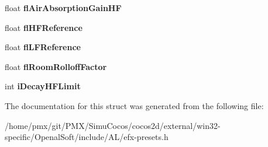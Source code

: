\begin{DoxyCompactItemize}
float {\bfseries fl\+Air\+Absorption\+Gain\+HF}
\item 
\mbox{\label{structEFXEAXREVERBPROPERTIES_af42ea95461db17e0b73b0a4decf720c3}} 
float {\bfseries fl\+H\+F\+Reference}
\item 
\mbox{\label{structEFXEAXREVERBPROPERTIES_a9d7409aeb14b972f77fd83643d7ecfaa}} 
float {\bfseries fl\+L\+F\+Reference}
\item 
\mbox{\label{structEFXEAXREVERBPROPERTIES_addd42aea886c8930594cf15f91fb8bec}} 
float {\bfseries fl\+Room\+Rolloff\+Factor}
\item 
\mbox{\label{structEFXEAXREVERBPROPERTIES_a454d6bbeaeaf108414712439d36679ff}} 
int {\bfseries i\+Decay\+H\+F\+Limit}
\end{DoxyCompactItemize}


The documentation for this struct was generated from the following file\+:\begin{DoxyCompactItemize}
\item 
/home/pmx/git/\+P\+M\+X/\+Simu\+Cocos/cocos2d/external/win32-\/specific/\+Openal\+Soft/include/\+A\+L/efx-\/presets.\+h\end{DoxyCompactItemize}
